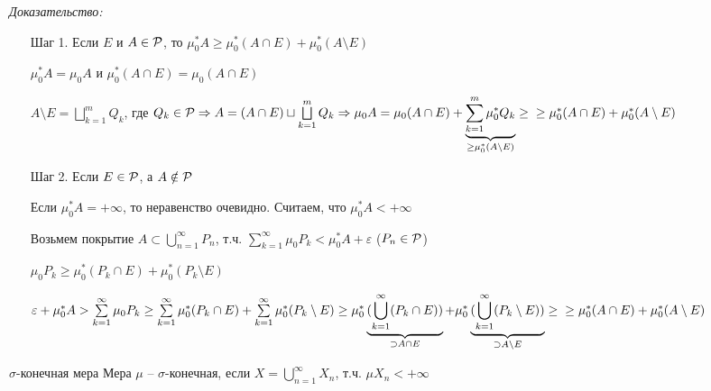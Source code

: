 \documentclass[12pt]{article}
\begin{document}
\textit{Доказательство:}

\begin{itemize}
    \item[Шаг 1.] Если $E$ и $A \in \P$, то $\mu_0^* A \geq \mu_0^* (A \cap E) + \mu_0^*(A \setminus E)$
    
    $\mu_0^* A = \mu_0 A$ и $\mu_0^* (A \cap E) = \mu_0(A \cap E)$

    $A \setminus E = \bigsqcup\limits_{k = 1}^m Q_k$, где $Q_k \in \P \Rightarrow A = (A \cap E) \sqcup \bigsqcup\limits_{k = 1}^m Q_k \Rightarrow \mu_0 A = \mu_0(A \cap E) + \underbrace{\sum\limits_{k = 1}^m \mu_0^* Q_k}_{\geq \mu_0^* (A \setminus E)} \geq \\
    \geq \mu_0^*(A \cap E) + \mu_0^*(A \setminus E)$

    \item[Шаг 2.] Если $E \in \P$, а $A \notin \P$
    
    Если $\mu_0^* A = + \infty$, то неравенство очевидно. Считаем, что $\mu_0^* A < + \infty$

    Возьмем покрытие $A \subset \bigcup\limits_{n = 1}^\infty P_n$, т.ч. $\sum\limits_{k = 1}^\infty \mu_0 P_k < \mu_0^* A + \varepsilon$ ($P_n \in \P$)

    $\mu_0 P_k \geq \mu_0^* (P_k \cap E) + \mu_0^* (P_k \setminus E)$

    $\varepsilon + \mu_0^* A > \sum\limits_{k = 1}^\infty \mu_0 P_k \geq \sum\limits_{k = 1}^\infty \mu_0^* (P_k \cap E) + \sum\limits_{k = 1}^\infty \mu_0^* (P_k \setminus E) \geq \mu_0^* \underbrace{(\bigcup\limits_{k = 1}^\infty (P_k \cap E))}_{\supset A \cap E} + \mu_0^* \underbrace{(\bigcup\limits_{k = 1}^\infty (P_k \setminus E))}_{\supset A \setminus E} \geq \\
    \geq \mu_0^* (A \cap E) + \mu_0^* (A \setminus E)$
\end{itemize}

\begin{defin}{$\sigma$-конечная мера}
    Мера $\mu$ -- $\sigma$-конечная, если $X = \bigcup\limits_{n = 1}^\infty X_n$, т.ч. $\mu X_n < + \infty$
\end{defin}
\end{document}
